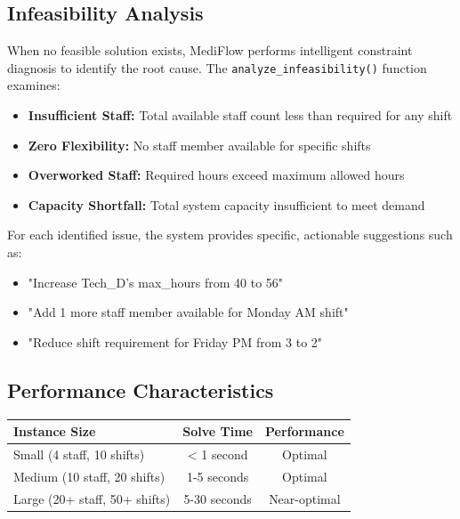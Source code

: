 \documentclass[12pt,a4paper]{article}
\begin{document}
\subsection{Infeasibility Analysis}

When no feasible solution exists, MediFlow performs intelligent constraint diagnosis to identify the root cause. The \texttt{analyze\_infeasibility()} function examines:

\begin{itemize}
    \item \textbf{Insufficient Staff:} Total available staff count less than required for any shift
    \item \textbf{Zero Flexibility:} No staff member available for specific shifts
    \item \textbf{Overworked Staff:} Required hours exceed maximum allowed hours
    \item \textbf{Capacity Shortfall:} Total system capacity insufficient to meet demand
\end{itemize}

For each identified issue, the system provides specific, actionable suggestions such as:
\begin{itemize}
    \item "Increase Tech\_D's max\_hours from 40 to 56"
    \item "Add 1 more staff member available for Monday AM shift"
    \item "Reduce shift requirement for Friday PM from 3 to 2"
\end{itemize}

\subsection{Performance Characteristics}

\begin{center}
\begin{tabular}{lcc}
\toprule
Instance Size & Solve Time & Performance \\
\midrule
Small (4 staff, 10 shifts) & < 1 second & Optimal \\
Medium (10 staff, 20 shifts) & 1-5 seconds & Optimal \\
Large (20+ staff, 50+ shifts) & 5-30 seconds & Near-optimal \\
\bottomrule
\end{tabular}
\end{center}

\newpage
\end{document}

